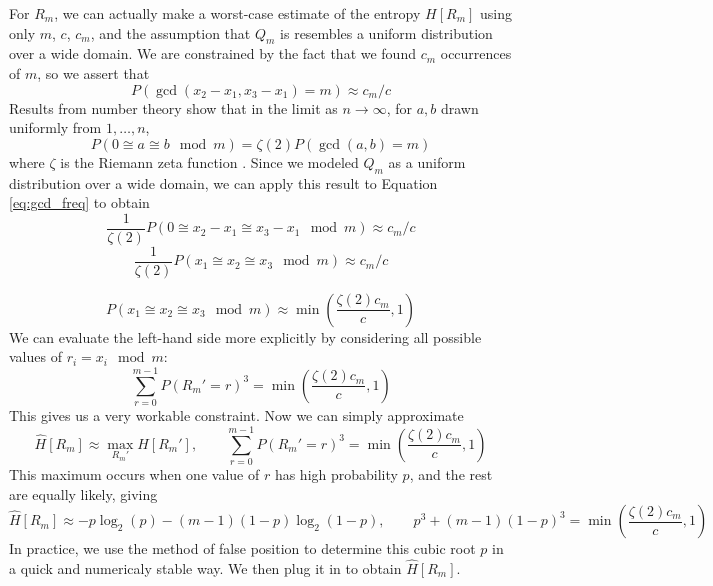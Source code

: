 \documentclass[letterpaper]{article}
\begin{document}
For $R_m$, we can actually make a worst-case estimate of the entropy $H[R_m]$ using only $m$, $c$, $c_m$, and the assumption that $Q_m$ is resembles a uniform distribution over a wide domain.
We are constrained by the fact that we found $c_m$ occurrences of $m$, so we assert that
\begin{equation}P(\gcd(x_2 - x_1, x_3 - x_1) = m) \approx c_m / c \label{eq:gcd_freq}\end{equation}
Results from number theory show that in the limit as $n\to\infty$, for $a, b$ drawn uniformly from $1, \ldots, n$,
\[P(0 \cong a \cong b \mod m) = \zeta(2)P(\gcd(a, b) = m)\]
where $\zeta$ is the Riemann zeta function \cite{gcd_probability}.
Since we modeled  $Q_m$ as a uniform distribution over a wide domain, we can apply this result to Equation \ref{eq:gcd_freq} to obtain
\[\frac{1}{\zeta(2)}P(0 \cong x_2 - x_1 \cong x_3 - x_1 \mod m) \approx c_m / c\]
\[\frac{1}{\zeta(2)}P(x_1 \cong x_2 \cong x_3 \mod m) \approx c_m / c\]

\[P(x_1 \cong x_2 \cong x_3 \mod m) \approx \min\left(\frac{\zeta(2)c_m}{c}, 1\right)\]
We can evaluate the left-hand side more explicitly by considering all possible values of $r_i = x_i \mod m$:
\[\sum_{r=0}^{m -1}P(R_m' = r)^3 = \min\left(\frac{\zeta(2)c_m}{c}, 1\right)\]
This gives us a very workable constraint.
Now we can simply approximate
\[\hat{H}[R_m] \approx \max_{R_m'}H[R_m'], \qquad \sum_{r=0}^{m-1} P(R_m' = r)^3 = \min\left(\frac{\zeta(2) c_m}{c}, 1\right)\]
This maximum occurs when one value of $r$ has high probability $p$, and the rest are equally likely, giving
\[\hat{H}[R_m] \approx -p\log_2(p) - (m - 1)(1-p)\log_2(1-p), \qquad p^3 + (m - 1)(1 - p)^3 = \min\left(\frac{\zeta(2) c_m}{c}, 1\right)\]
In practice, we use the method of false position to determine this cubic root $p$ in a quick and numericaly stable way.
We then plug it in to obtain $\hat{H}[R_m]$.
\end{document}
